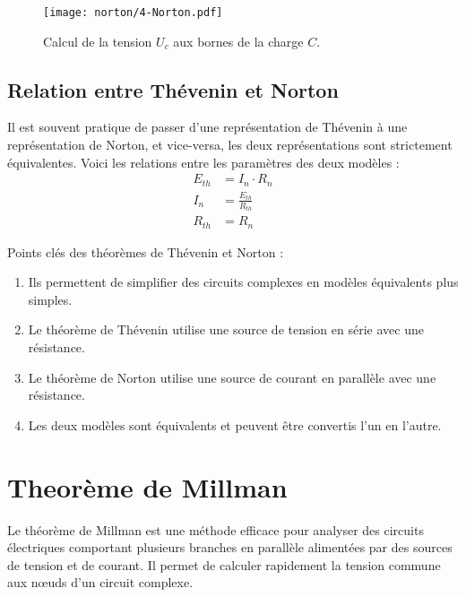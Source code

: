 \begin{figure}[H]
	\centering
    \texttt{[image: norton/4-Norton.pdf]}
    \caption{Calcul de la tension \(U_{c}\) aux bornes de la charge \(C\).}
\end{figure}

\subsection{Relation entre Th\'evenin et Norton}

Il est souvent pratique de passer d'une repr\'esentation de Th\'evenin à une
repr\'esentation de Norton, et vice-versa, les deux repr\'esentations sont
strictement \'equivalentes. Voici les relations entre les param\`etres des deux
mod\`eles :
\begin{align*}
  E_{th} & = I_{n} \cdot R_{n} \\
  I_{n} & = \frac{E_{th}}{R_{th}} \\
  R_{th} & = R_{n}
\end{align*}

\begin{Note}
	Points cl\'es des th\'eor\`emes de Th\'evenin et Norton :
    \begin{enumerate}
        \item Ils permettent de simplifier des circuits complexes en mod\`eles \'equivalents plus simples.
        \item Le th\'eor\`eme de Th\'evenin utilise une source de tension en s\'erie avec une r\'esistance.
        \item Le th\'eor\`eme de Norton utilise une source de courant en parall\`ele avec une r\'esistance.
        \item Les deux mod\`eles sont \'equivalents et peuvent \^etre convertis l’un en l’autre.
    \end{enumerate}
\end{Note}

\section{Theor\`eme de Millman} \label{subsec:millman}
Le th\'eor\`eme de Millman est une m\'ethode efficace pour analyser des circuits \'electriques comportant plusieurs branches en parall\`ele aliment\'ees par des sources de tension et de courant. Il permet de calculer rapidement la tension commune aux nœuds d’un circuit complexe.
